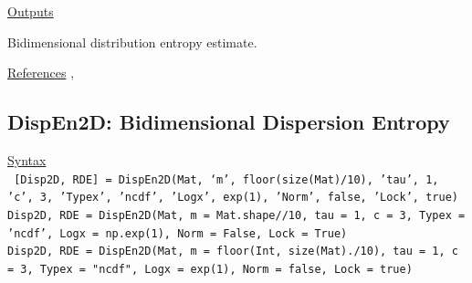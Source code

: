 \documentclass[12pt, a4paper, titlepage, openany]{book}
\begin{document}
\noindent \ul{Outputs}
\begin{description}[labelsep=1cm, labelwidth=2cm, nosep, style=multiline,leftmargin=3cm]\footnotesize
\item[\texttt{Dist2D}]		Bidimensional distribution entropy estimate.
\end{description}

\noindent \ul{References}\hspace{1cm}
\cite{Dist2D1},



\newpage
\subsection{\normalsize DispEn2D: \hspace{15mm} Bidimensional Dispersion Entropy}\label{DispEn2D}
\noindent\ul{Syntax} \vspace{6mm} \\ \noindent \texttt{\footnotesize
[Disp2D, RDE] = DispEn2D(Mat, ‘m’, floor(size(Mat)/10), 'tau', 1, 'c', 3, 'Typex', 'ncdf', 'Logx', exp(1), 'Norm', false, 'Lock', true)\\
Disp2D, RDE  = DispEn2D(Mat, m = Mat.shape//10, tau = 1, c = 3, Typex = 'ncdf', Logx = np.exp(1), Norm = False, Lock = True)\\
Disp2D, RDE  = DispEn2D(Mat, m = floor(Int, size(Mat)./10), tau = 1, c = 3, Typex = "ncdf", Logx = exp(1), Norm = false, Lock = true)}
\end{document}
